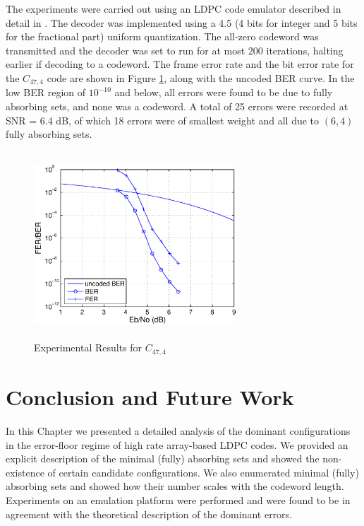  The experiments were carried out using an LDPC code
emulator described in detail in \cite{zhang06}. The decoder was
implemented using a 4.5 (4 bits for integer and 5 bits for the
fractional part) uniform quantization. The all-zero codeword was
transmitted and the decoder was set to run for at most 200
iterations, halting earlier if decoding to a codeword. The frame
error rate and the bit error rate for the $C_{47,4}$ code are
shown in Figure \ref{expif}, along with the uncoded BER curve. In
the low BER region of $10^{-10}$ and below,
all errors were found to be due to %
fully absorbing sets, and none was a codeword. A total of 25
errors were recorded at SNR = 6.4 dB, of which 18 errors were of
smallest weight and all due to $(6,4)$ fully absorbing sets.

\vspace{0in}
\begin{figure}[h]
\center\includegraphics[keepaspectratio,width=3.0in,height=2.75in]{474_lara3.eps}
\caption{Experimental Results for $C_{47,4}$} \label{expif}
\end{figure}

\vspace{-0.00in}\section{Conclusion and Future Work}\label{conc}



In this Chapter we presented a detailed analysis of the dominant
configurations in the error-floor regime of high rate array-based
LDPC codes. We provided an explicit description of the minimal
(fully) absorbing sets and showed the non-existence of certain
candidate configurations. We also enumerated minimal (fully)
absorbing sets and showed how their number scales with the
codeword length. Experiments on an emulation platform were
performed and were found to be in agreement with the theoretical
description of the dominant errors.
